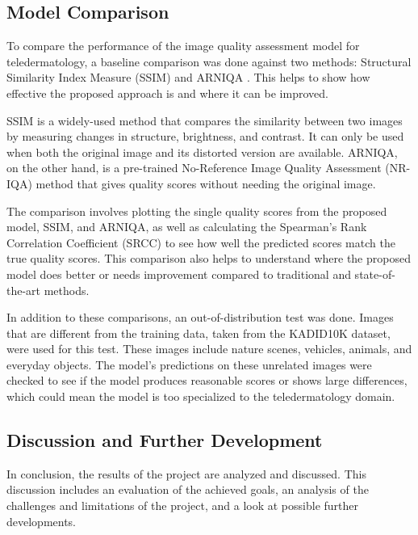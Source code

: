 \subsection{Model Comparison}
\label{sub:basecomp}
To compare the performance of the image quality assessment model for teledermatology, a baseline comparison was done against two methods: Structural Similarity Index Measure (SSIM) and ARNIQA \autocite{ARNIQA}. This helps to show how effective the proposed approach is and where it can be improved. \par 
\vspace{\baselineskip}
\noindent
SSIM is a widely-used method that compares the similarity between two images by measuring changes in structure, brightness, and contrast. It can only be used when both the original image and its distorted version are available. ARNIQA, on the other hand, is a pre-trained No-Reference Image Quality Assessment (NR-IQA) method that gives quality scores without needing the original image. \par 
\vspace{\baselineskip}
\noindent
The comparison involves plotting the single quality scores from the proposed model, SSIM, and ARNIQA, as well as calculating the Spearman’s Rank Correlation Coefficient (SRCC) to see how well the predicted scores match the true quality scores. This comparison also helps to understand where the proposed model does better or needs improvement compared to traditional and state-of-the-art methods. \par
\vspace{\baselineskip}
\noindent
In addition to these comparisons, an out-of-distribution test was done. Images that are different from the training data, taken from the KADID10K \autocite{KADID10k} dataset, were used for this test. These images include nature scenes, vehicles, animals, and everyday objects. The model’s predictions on these unrelated images were checked to see if the model produces reasonable scores or shows large differences, which could mean the model is too specialized to the teledermatology domain. \par

\subsection{Discussion and Further Development}
\label{sub:DiscussionDevelopment}
In conclusion, the results of the project are analyzed and discussed. This discussion includes an evaluation of the achieved goals, an analysis of the challenges and limitations of the project, and a look at possible further developments. \par
